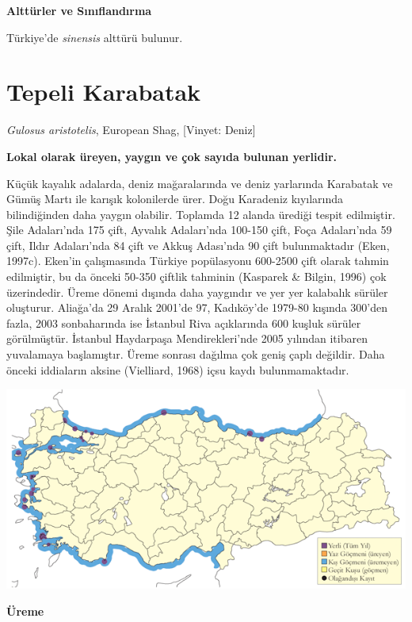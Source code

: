 \documentclass[
  a4paper,
  DIV=11,
  numbers=noendperiod]{scrreprt}
\begin{document}
\textbf{Alttürler ve Sınıflandırma}

Türkiye'de \emph{sinensis} alttürü bulunur.

\section{Tepeli Karabatak}\label{tepeli-karabatak}

\emph{Gulosus aristotelis}, European Shag, {[}Vinyet: Deniz{]}

\textbf{Lokal olarak üreyen, yaygın ve çok sayıda bulunan yerlidir.}

Küçük kayalık adalarda, deniz mağaralarında ve deniz yarlarında
Karabatak ve Gümüş Martı ile karışık kolonilerde ürer. Doğu Karadeniz
kıyılarında bilindiğinden daha yaygın olabilir. Toplamda 12 alanda
ürediği tespit edilmiştir. Şile Adaları'nda 175 çift, Ayvalık
Adaları'nda 100-150 çift, Foça Adaları'nda 59 çift, Ildır Adaları'nda 84
çift ve Akkuş Adası'nda 90 çift bulunmaktadır (Eken, 1997c). Eken'in
çalışmasında Türkiye popülasyonu 600-2500 çift olarak tahmin edilmiştir,
bu da önceki 50-350 çiftlik tahminin (Kasparek \& Bilgin, 1996) çok
üzerindedir. Üreme dönemi dışında daha yaygındır ve yer yer kalabalık
sürüler oluşturur. Aliağa'da 29 Aralık 2001'de 97, Kadıköy'de 1979-80
kışında 300'den fazla, 2003 sonbaharında ise İstanbul Riva açıklarında
600 kuşluk sürüler görülmüştür. İstanbul Haydarpaşa Mendirekleri'nde
2005 yılından itibaren yuvalamaya başlamıştır. Üreme sonrası dağılma çok
geniş çaplı değildir. Daha önceki iddiaların aksine (Vielliard, 1968)
içsu kaydı bulunmamaktadır.

\includegraphics{images/harita_Page_078.png}

\textbf{Üreme}
\end{document}
